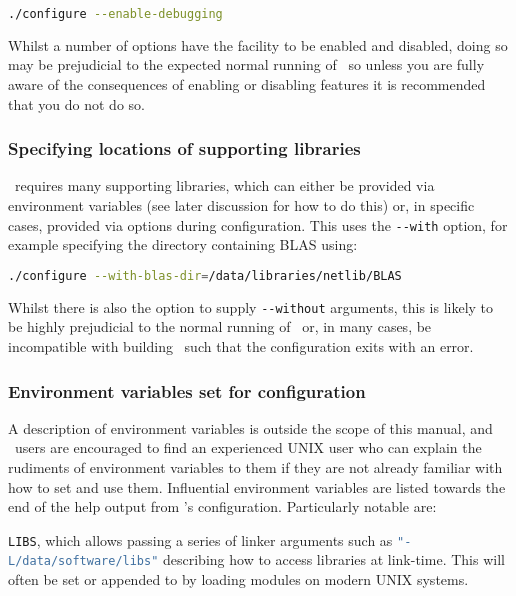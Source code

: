 \begin{lstlisting}[language=Bash]
./configure --enable-debugging
\end{lstlisting}

Whilst a number of options have the facility to be enabled and disabled, doing
so may be prejudicial to the expected normal running of \fluidity\ so unless you
are fully aware of the consequences of enabling or disabling features it is
recommended that you do not do so.

\subsubsection{Specifying locations of supporting libraries}
\label{sec:configure_locate_supporting_libs}

\fluidity\ requires many supporting libraries, which can either be provided via
environment variables (see later discussion for how to do this) or, in specific
cases, provided via options during configuration. This uses the
\lstinline[language=Bash]+--with+ option, for example specifying the directory
containing BLAS using:

\begin{lstlisting}[language=Bash]
./configure --with-blas-dir=/data/libraries/netlib/BLAS
\end{lstlisting}

Whilst there is also the option to supply \lstinline[language=Bash]+--without+
arguments, this is likely to be highly prejudicial to the normal running of
\fluidity\ or, in many cases, be incompatible with building \fluidity\ such that
the configuration exits with an error.

\subsubsection{Environment variables set for configuration}
\label{sec:configure_environment_vars}

A description of environment variables is outside the scope of this manual, and
\fluidity\ users are encouraged to find an experienced UNIX user who can explain
the rudiments of environment variables to them if they are not already familiar
with how to set and use them. Influential environment variables are listed
towards the end of the help output from \fluidity's configuration. Particularly
notable are:

\lstinline[language=Bash]+LIBS+, which allows passing a series of linker
arguments such as \lstinline[language=Bash]+"-L/data/software/libs"+ describing
how to access libraries at link-time. This will often be set or appended to by
loading modules on modern UNIX systems.

